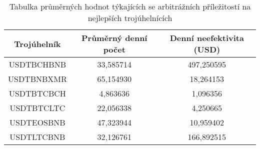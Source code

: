 \begin{table}\centering
\caption{Tabulka průměrných hodnot týkajících se arbitrážních příležitostí na nejlepších trojúhelnících}
\label{table_combined_best}
\begin{tabular}{|| c | c | c ||}\hline Trojúhelník & Průměrný denní počet & Denní neefektivita (USD)\\ [0.5ex]
 \hline\hline USDTBCHBNB & 33,585714 & 497,250595\\ 
 \hline USDTBNBXMR & 65,154930 & 18,264153\\ 
 \hline USDTBTCBCH & 4,863636 & 1,096356\\ 
 \hline USDTBTCLTC & 22,056338 & 4,250665\\ 
 \hline USDTEOSBNB & 47,323944 & 10,959402\\ 
 \hline USDTLTCBNB & 32,126761 & 166,892515\\ 
 \hline
\end{tabular}
\end{table}